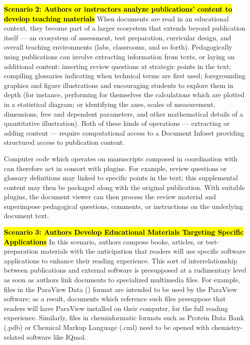 \documentclass[10pt,letterpaper]{article}
\newcommand{\pseudoIndent}{

\vspace{10pt}\hspace*{38pt}}
\newcommand{\PVD}{\resizebox{!}{8pt}{\AcronymText{PVD}}}
\newcommand{\LPF}{\resizebox{!}{8pt}{\AcronymText{LPF}}}
\newcommand{\EPF}{\resizebox{!}{8pt}{\AcronymText{EPF}}}
\newcommand{\textscc}[1]{{\color{orr!35!black}{{%
						\fontfamily{Cabin-TLF}\fontseries{b}\selectfont{\textsc{\scriptsize{#1}}}}}}}
\newcommand{\AcronymText}[1]{{\textscc{#1}}}
\newcommand{\PDF}{\resizebox{!}{8pt}{\AcronymText{PDF}}}
\newenvironment{mldescription}{\vspace{1em}%
  \begin{addmargin}[4pt]{1em}
    \setlength{\parindent}{-1em}%
    \newcommand*{\mlitem}[1][]{\vspace{5pt}\par\medskip%
\hl{\textbf{##1}}\quad}\indent
}{%
  \end{addmargin}
  \medskip
}
\newcommand{\mnote}[1]{%
\vspace*{-2em}
\reversemarginpar
\raisebox{1em}{\marginnote{\parbox{4em}{%
\begin{mdframed}[innerleftmargin=4pt,
	innerrightmargin=1pt,innertopmargin=1pt,
	linecolor=red!20!cyan,userdefinedwidth=4em,
	topline=false,
	rightline=false]
{{\fontfamily{ppl}\fontsize{12}{0}\selectfont
		\textit{#1}}}
\end{mdframed}}
	}[3em]}}
\begin{document}
{{\begin{mldescription}
\vspace{.5em}
\mlitem[Scenario 2: Authors or instructors 
analyze publications' content to develop teaching 
materials]  When documents are read in an 
educational context, they become part of a 
larger ecosystem that extends beyond publication 
itself --- an ecosystem of assessment, test preparation, 
curricular design, and overall teaching environments 
(labs, classrooms, and so forth).  
Pedagogically using publications can involve extracting 
information from texts, or laying on additional 
content: inserting review questions at strategic 
points in the text; compiling glossaries indicating 
when technical terms are first used; foregrounding 
graphics and figure illustrations and encouraging 
students to explore them in depth 
(for instance, performing for themselves the calculations 
which are plotted in a statistical diagram; or 
identifying the axes, scales of measurement, dimensions, 
free and dependent parameters, and other mathematical 
details of a quantitative illustration).  Both of 
these kinds of operations --- extracting or adding 
content --- require computational access to a 
Document Infoset providing 
structured access to publication content.   

\pseudoIndent{} Computer code which operates on 
manuscripts composed in coordination with 
\EPF{} can therefore act 
in consort with \EPF{} plugins.  For example, review questions 
or glossary definitions may linked to specific points 
in the text; this supplemental content may then 
be packaged along with the original publication.  
With suitable \EPF{} plugins, the document viewer 
can then process the review material and 
superimpose pedagogical questions, comments, or instructions 
on the underlying document text.     

\vspace{1em}
\mlitem[Scenario 3: Authors Develop Educational 
Materials Targeting Specific Applications]
In this scenario, authors compose books, articles, 
or test-preparation materials with the anticipation 
that readers will use specific software applications to 
enhance their reading experience.  This sort 
of interrelationship between publications and external 
software is presupposed at a rudimentary level 
as soon as authors link documents to specialized 
multimedia files.  For example, files in the 
ParaView Data (\PVD{}) format are intended to be 
used by the ParaView software; as a result, documents 
which reference such files presuppose that readers 
will have ParaView installed on their computer, for 
the full reading experience.  Similarly, files 
in cheminformatic formats such as Protein Data Bank 
(.pdb) or Chemical Markup Language (.cml) need to 
be opened with chemistry-related software like IQmol.  


\end{mldescription}}}
\end{document}
